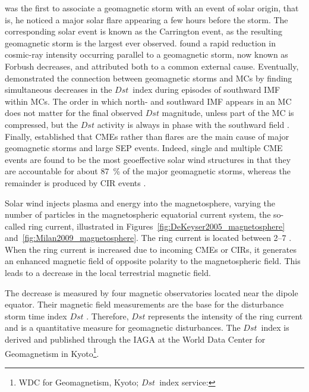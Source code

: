 \citet{Carrington1859} was the first to associate a geomagnetic storm with an event of solar origin, that is, he noticed a major solar flare appearing a few hours before the storm. The corresponding solar event is known as the Carrington event, as the resulting geomagnetic storm is the largest ever observed. \citet{Forbush1937} found a rapid reduction in cosmic-ray intensity occurring parallel to a geomagnetic storm, now known as Forbush decreases, and attributed both to a common external cause. Eventually, \citet{Wilson1987} demonstrated the connection between geomagnetic storms and MCs by finding simultaneous decreases in the $Dst$~index during episodes of southward IMF within MCs. The order in which north- and southward IMF appears in an MC does not matter for the final observed $Dst$ magnitude, unless part of the MC is compressed, but the $Dst$ activity is always in phase with the southward field \citep{Zhang1988}. Finally, \citet{Gosling1993} established that CMEs rather than flares are the main cause of major geomagnetic storms and large SEP events. Indeed, single and multiple CME events are found to be the most geoeffective solar wind structures in that they are accountable for about \SI{87}{\%} of the major geomagnetic storms, whereas the remainder is produced by CIR events \citep{Bothmer1995,Zhang2007}.

Solar wind injects plasma and energy into the magnetosphere, varying the number of particles in the magnetospheric equatorial current system, the so-called ring current, illustrated in Figures~\ref{fig:DeKeyser2005_magnetosphere} and~\ref{fig:Milan2009_magnetosphere}. The ring current is located between \SIrange{2}{7}{\RE} \citep{Gonzalez1994}. When the ring current is increased due to incoming CMEs or CIRs, it generates an enhanced magnetic field of opposite polarity to the magnetospheric field. This leads to a decrease in the local terrestrial magnetic field.

The decrease is measured by four magnetic observatories located near the dipole equator. Their magnetic field measurements are the base for the disturbance storm time index $Dst$ \citep{Sugiura1991}. Therefore, $Dst$ represents the intensity of the ring current and is a quantitative measure for geomagnetic disturbances. The $Dst$~index is derived and published through the IAGA at the World Data Center for Geomagnetism in Kyoto\footnote{WDC for Geomagnetism, Kyoto; $Dst$~index service: }.

